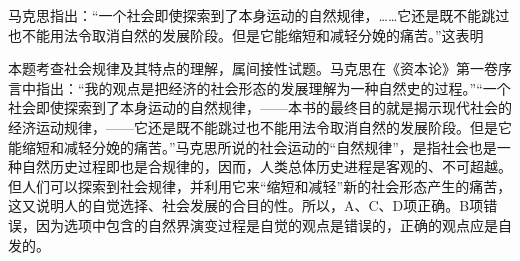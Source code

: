\question 马克思指出：``一个社会即使探索到了本身运动的自然规律，\ldots{}\ldots{}它还是既不能跳过也不能用法令取消自然的发展阶段。但是它能缩短和减轻分娩的痛苦。''这表明
\par{}
\begin{solution}本题考查社会规律及其特点的理解，属间接性试题。马克思在《资本论》第一卷序言中指出：``我的观点是把经济的社会形态的发展理解为一种自然史的过程。''``一个社会即使探索到了本身运动的自然规律，------本书的最终目的就是揭示现代社会的经济运动规律，------它还是既不能跳过也不能用法令取消自然的发展阶段。但是它能缩短和减轻分娩的痛苦。''马克思所说的社会运动的``自然规律''，是指社会也是一种自然历史过程即也是合规律的，因而，人类总体历史进程是客观的、不可超越。但人们可以探索到社会规律，并利用它来``缩短和减轻''新的社会形态产生的痛苦，这又说明人的自觉选择、社会发展的合目的性。所以，A、C、D项正确。B项错误，因为选项中包含的自然界演变过程是自觉的观点是错误的，正确的观点应是自发的。
\end{solution}
